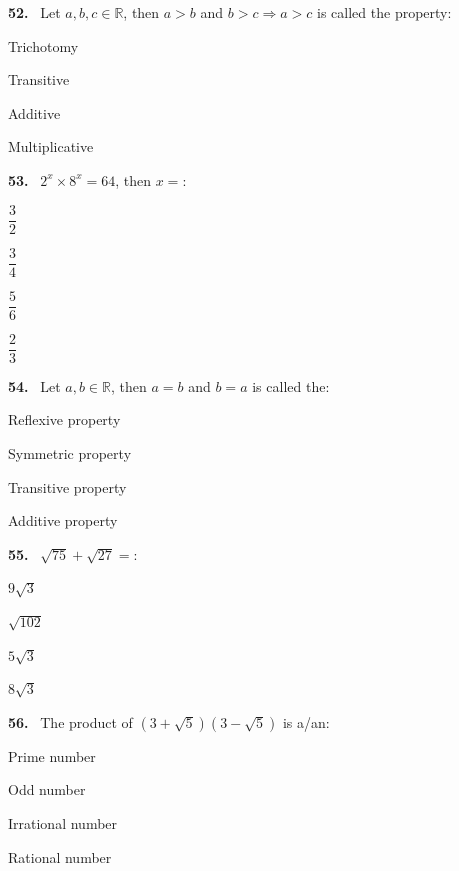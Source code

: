 \documentclass[11pt]{article}
\newenvironment{qenv}[1]{%
  \par\medskip\noindent\textbf{#1.}\ \ignorespaces
}{\par}
\begin{document}
\begin{qenv}{52} Let $a,b,c\in\mathbb{R}$, then $a>b$ and $b>c \Rightarrow a>c$ is called the \underline{\hspace{2cm}} property:
\begin{options} \item Trichotomy \item Transitive \item Additive \item Multiplicative \end{options} \end{qenv}

\begin{qenv}{53} $2^x \times 8^x = 64$, then $x=$:
\begin{options} \item $\dfrac{3}{2}$ \item $\dfrac{3}{4}$ \item $\dfrac{5}{6}$ \item $\dfrac{2}{3}$ \end{options} \end{qenv}

\begin{qenv}{54} Let $a,b\in\mathbb{R}$, then $a=b$ and $b=a$ is called the:
\begin{options} \item Reflexive property \item Symmetric property \item Transitive property \item Additive property \end{options} \end{qenv}

\begin{qenv}{55} $\sqrt{75}+\sqrt{27}=$:
\begin{options} \item $9\sqrt{3}$ \item $\sqrt{102}$ \item $5\sqrt{3}$ \item $8\sqrt{3}$ \end{options} \end{qenv}

\begin{qenv}{56} The product of $(3+\sqrt{5})(3-\sqrt{5})$ is a/an:
\begin{options} \item Prime number \item Odd number \item Irrational number \item Rational number \end{options} \end{qenv}
\end{document}
